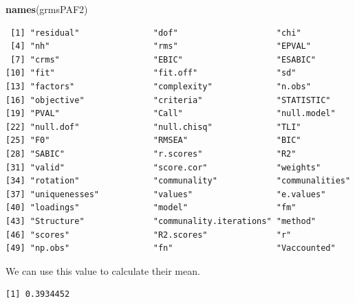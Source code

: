 \documentclass[
  english,
]{book}
\newenvironment{Shaded}{\begin{snugshade}}{\end{snugshade}}
\newcommand{\CommentTok}[1]{\textcolor[rgb]{0.56,0.35,0.01}{\textit{#1}}}
\newcommand{\KeywordTok}[1]{\textcolor[rgb]{0.13,0.29,0.53}{\textbf{#1}}}
\newcommand{\NormalTok}[1]{#1}
\newcommand{\OperatorTok}[1]{\textcolor[rgb]{0.81,0.36,0.00}{\textbf{#1}}}
\begin{document}
\begin{Shaded}
\begin{Highlighting}[]
\KeywordTok{names}\NormalTok{(grmsPAF2)}
\end{Highlighting}
\end{Shaded}

\begin{verbatim}
 [1] "residual"               "dof"                    "chi"                   
 [4] "nh"                     "rms"                    "EPVAL"                 
 [7] "crms"                   "EBIC"                   "ESABIC"                
[10] "fit"                    "fit.off"                "sd"                    
[13] "factors"                "complexity"             "n.obs"                 
[16] "objective"              "criteria"               "STATISTIC"             
[19] "PVAL"                   "Call"                   "null.model"            
[22] "null.dof"               "null.chisq"             "TLI"                   
[25] "F0"                     "RMSEA"                  "BIC"                   
[28] "SABIC"                  "r.scores"               "R2"                    
[31] "valid"                  "score.cor"              "weights"               
[34] "rotation"               "communality"            "communalities"         
[37] "uniquenesses"           "values"                 "e.values"              
[40] "loadings"               "model"                  "fm"                    
[43] "Structure"              "communality.iterations" "method"                
[46] "scores"                 "R2.scores"              "r"                     
[49] "np.obs"                 "fn"                     "Vaccounted"            
\end{verbatim}

We can use this value to calculate their mean.

\begin{Shaded}
\end{Shaded}

\begin{verbatim}
[1] 0.3934452
\end{verbatim}

\begin{Shaded}
\end{Shaded}
\end{document}
